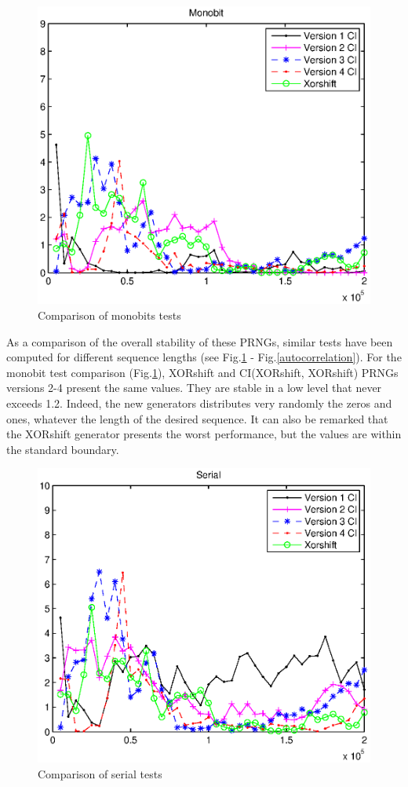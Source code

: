 \begin{figure}
\centering
\includegraphics[scale=0.8]{monobits.eps}
\caption{Comparison of monobits tests}
\label{monobits}
\end{figure}

As a comparison of the overall stability of these PRNGs, similar tests have been computed for different sequence lengths (see Fig.\ref{monobits} - Fig.\ref{autocorrelation}).
For the monobit test comparison (Fig.\ref{monobits}), XORshift and CI(XORshift, XORshift) PRNGs versions 2-4 present the same values. They are stable in a low level that never exceeds 1.2. Indeed, the new generators distributes very randomly the zeros and ones, whatever the length of the desired sequence. 
It can also be remarked that the XORshift generator presents the worst performance, but the values are within the standard boundary.
\begin{figure}
\centering
\includegraphics[scale=0.8]{serial.eps}
\caption{Comparison of serial tests}
\label{serial}
\end{figure}

